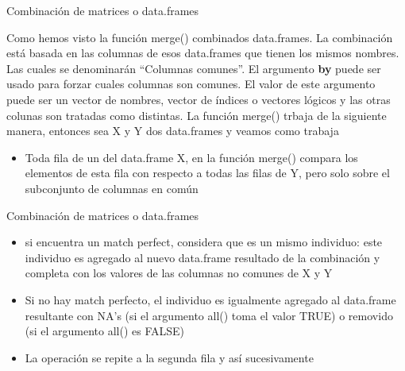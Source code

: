 \documentclass[ignorenonframetext,]{beamer}
\providecommand{\tightlist}{%
  \setlength{\itemsep}{0pt}\setlength{\parskip}{0pt}}
\begin{document}
\begin{frame}{Combinación de matrices o data.frames}

Como hemos visto la función merge() combinados data.frames. La
combinación está basada en las columnas de esos data.frames que tienen
los mismos nombres. Las cuales se denominarán ``Columnas comunes''. El
argumento \textbf{by} puede ser usado para forzar cuales columnas son
comunes. El valor de este argumento puede ser un vector de nombres,
vector de índices o vectores lógicos y las otras colunas son tratadas
como distintas. La función merge() trbaja de la siguiente manera,
entonces sea X y Y dos data.frames y veamos como trabaja

\begin{itemize}
\tightlist
\item
  Toda fila de un del data.frame X, en la función merge() compara los
  elementos de esta fila con respecto a todas las filas de Y, pero solo
  sobre el subconjunto de columnas en común
\end{itemize}

\end{frame}

\begin{frame}{Combinación de matrices o data.frames}

\begin{itemize}
\item
  si encuentra un match perfect, considera que es un mismo individuo:
  este individuo es agregado al nuevo data.frame resultado de la
  combinación y completa con los valores de las columnas no comunes de X
  y Y
\item
  Si no hay match perfecto, el individuo es igualmente agregado al
  data.frame resultante con NA's (si el argumento all() toma el valor
  TRUE) o removido (si el argumento all() es FALSE)
\item
  La operación se repite a la segunda fila y así sucesivamente
\end{itemize}

\end{frame}
\end{document}
